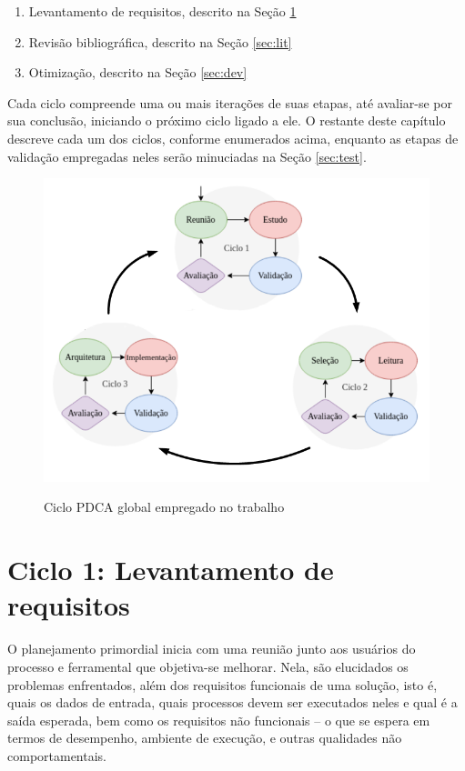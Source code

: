 \documentclass[cic,tc]{iiufrgs}
\begin{document}
\begin{enumerate}
    \item Levantamento de requisitos, descrito na Seção \ref{sec:plan}
    \item Revisão bibliográfica, descrito na Seção \ref{sec:lit}
    \item Otimização, descrito na Seção \ref{sec:dev}
\end{enumerate}

Cada ciclo compreende uma ou mais iterações de suas etapas, até avaliar-se por
sua conclusão, iniciando o próximo ciclo ligado a ele. O restante deste
capítulo descreve cada um dos ciclos, conforme enumerados acima, enquanto as etapas
de validação empregadas neles serão minuciadas na Seção \ref{sec:test}.

\begin{figure}[H] \caption{Ciclo PDCA global empregado no trabalho} \begin{center}
\includegraphics[width=0.85\linewidth]{img/pdca_global.png} \end{center}
 \label{fig:pdca_global} \end{figure}

\section{Ciclo 1: Levantamento de requisitos}
\label{sec:plan}

O planejamento primordial inicia com uma reunião junto aos usuários do processo
e ferramental que objetiva-se melhorar. Nela, são elucidados os problemas
enfrentados, além dos requisitos funcionais de uma solução, isto é, quais os
dados de entrada, quais processos devem ser executados neles e qual é a saída
esperada, bem como os requisitos não funcionais -- o que se espera em termos de
desempenho, ambiente de execução, e outras qualidades não comportamentais. 
\end{document}

